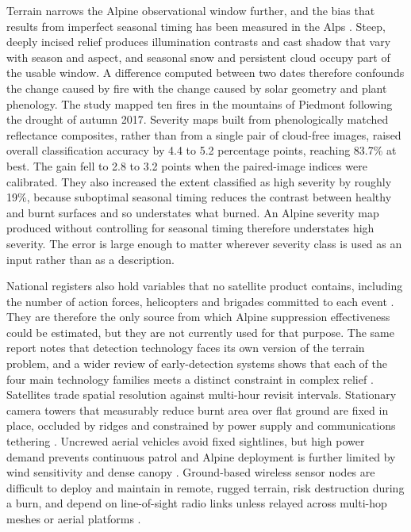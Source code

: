\documentclass[11pt,a4paper]{article}
\begin{document}
Terrain narrows the Alpine observational window further, and the bias that results from imperfect seasonal timing has been measured in the Alps \citep{morresi_mapping_2022}. Steep, deeply incised relief produces illumination contrasts and cast shadow that vary with season and aspect, and seasonal snow and persistent cloud occupy part of the usable window. A difference computed between two dates therefore confounds the change caused by fire with the change caused by solar geometry and plant phenology. The study mapped ten fires in the mountains of Piedmont following the drought of autumn 2017. Severity maps built from phenologically matched reflectance composites, rather than from a single pair of cloud-free images, raised overall classification accuracy by 4.4 to 5.2 percentage points, reaching 83.7\% at best. The gain fell to 2.8 to 3.2 points when the paired-image indices were calibrated. They also increased the extent classified as high severity by roughly 19\%, because suboptimal seasonal timing reduces the contrast between healthy and burnt surfaces and so understates what burned. An Alpine severity map produced without controlling for seasonal timing therefore understates high severity. The error is large enough to matter wherever severity class is used as an input rather than as a description.

National registers also hold variables that no satellite product contains, including the number of action forces, helicopters and brigades committed to each event \citep{muller_forest_2020}. They are therefore the only source from which Alpine suppression effectiveness could be estimated, but they are not currently used for that purpose. The same report notes that detection technology faces its own version of the terrain problem, and a wider review of early-detection systems shows that each of the four main technology families meets a distinct constraint in complex relief \citep{muller_forest_2020, mohapatra_early_2022}. Satellites trade spatial resolution against multi-hour revisit intervals. Stationary camera towers that measurably reduce burnt area over flat ground are fixed in place, occluded by ridges and constrained by power supply and communications tethering \citep{muller_forest_2020, mohapatra_early_2022}. Uncrewed aerial vehicles avoid fixed sightlines, but high power demand prevents continuous patrol and Alpine deployment is further limited by wind sensitivity and dense canopy \citep{muller_forest_2020, mohapatra_early_2022}. Ground-based wireless sensor nodes are difficult to deploy and maintain in remote, rugged terrain, risk destruction during a burn, and depend on line-of-sight radio links unless relayed across multi-hop meshes or aerial platforms \citep{mohapatra_early_2022}.
\end{document}
